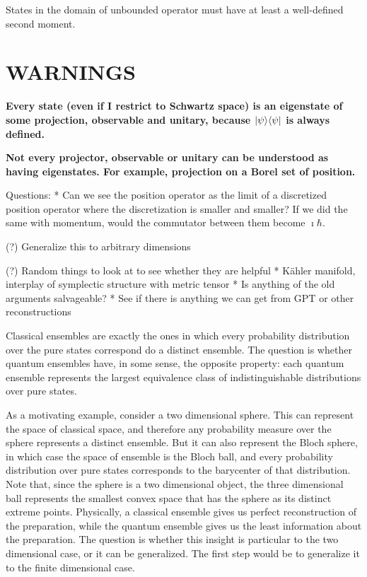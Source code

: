 \begin{insight}
	States in the domain of unbounded operator must have at least a well-defined second moment.
\end{insight}


\section{WARNINGS}

\textbf{Every state (even if I restrict to Schwartz space) is an eigenstate of some projection, observable and unitary, because $|\psi \rangle \langle \psi|$ is always defined.}

\textbf{Not every projector, observable or unitary can be understood as having eigenstates. For example, projection on a Borel set of position.}


Questions:
* Can we see the position operator as the limit of a discretized position operator where the discretization is smaller and smaller? If we did the same with momentum, would the commutator between them become $\imath \hbar$.

(?) Generalize this to arbitrary dimensions

(?) Random things to look at to see whether they are helpful
* Kähler manifold, interplay of symplectic structure with metric tensor
* Is anything of the old arguments salvageable?
* See if there is anything we can get from GPT or other reconstructions

{Classical ensembles are exactly the ones in which every probability distribution over the pure states correspond do a distinct ensemble. The question is whether quantum ensembles have, in some sense, the opposite property: each quantum ensemble represents the largest equivalence class of indistinguishable distributions over pure states.}

As a motivating example, consider a two dimensional sphere. This can represent the space of classical space, and therefore any probability measure over the sphere represents a distinct ensemble. But it can also represent the Bloch sphere, in which case the space of ensemble is the Bloch ball, and every probability distribution over pure states corresponds to the barycenter of that distribution. Note that, since the sphere is a two dimensional object, the three dimensional ball represents the smallest convex space that has the sphere as its distinct extreme points. Physically, a classical ensemble gives us perfect reconstruction of the preparation, while the quantum ensemble gives us the least information about the preparation. The question is whether this insight is particular to the two dimensional case, or it can be generalized. The first step would be to generalize it to the finite dimensional case.

